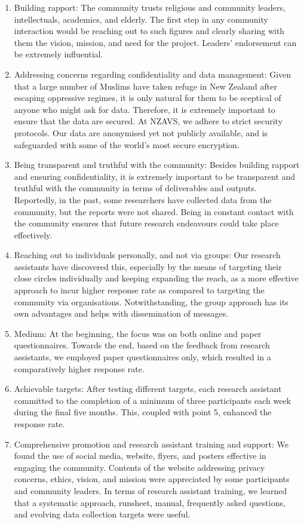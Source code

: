\documentclass[
]{interact}
\begin{document}
\begin{enumerate}
\def\labelenumi{\arabic{enumi}.}
\item
  Building rapport: The community trusts religious and community
  leaders, intellectuals, academics, and elderly. The first step in any
  community interaction would be reaching out to such figures and
  clearly sharing with them the vision, mission, and need for the
  project. Leaders' endorsement can be extremely influential.
\item
  Addressing concerns regarding confidentiality and data management:
  Given that a large number of Muslims have taken refuge in New Zealand
  after escaping oppressive regimes, it is only natural for them to be
  sceptical of anyone who might ask for data. Therefore, it is extremely
  important to ensure that the data are secured. At NZAVS, we adhere to
  strict security protocols. Our data are anonymised yet not publicly
  available, and is safeguarded with some of the world's most secure
  encryption.
\item
  Being transparent and truthful with the community: Besides building
  rapport and ensuring confidentiality, it is extremely important to be
  transparent and truthful with the community in terms of deliverables
  and outputs. Reportedly, in the past, some researchers have collected
  data from the community, but the reports were not shared. Being in
  constant contact with the community ensures that future research
  endeavours could take place effectively.
\item
  Reaching out to individuals personally, and not via groups: Our
  research assistants have discovered this, especially by the means of
  targeting their close circles individually and keeping expanding the
  reach, as a more effective approach to incur higher response rate as
  compared to targeting the community via organisations.
  Notwithstanding, the group approach has its own advantages and helps
  with dissemination of messages.
\item
  Medium: At the beginning, the focus was on both online and paper
  questionnaires. Towards the end, based on the feedback from research
  assistants, we employed paper questionnaires only, which resulted in a
  comparatively higher response rate.
\item
  Achievable targets: After testing different targets, each research
  assistant committed to the completion of a minimum of three
  participants each week during the final five months. This, coupled
  with point 5, enhanced the response rate.
\item
  Comprehensive promotion and research assistant training and support:
  We found the use of social media, website, flyers, and posters
  effective in engaging the community. Contents of the website
  addressing privacy concerns, ethics, vision, and mission were
  appreciated by some participants and community leaders. In terms of
  research assistant training, we learned that a systematic approach,
  runsheet, manual, frequently asked questions, and evolving data
  collection targets were useful.
\end{enumerate}
\end{document}
